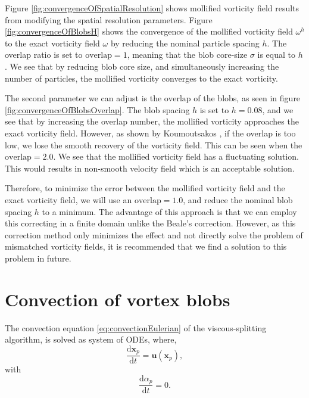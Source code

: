 Figure \ref{fig:convergenceOfSpatialResolution} shows mollified vorticity field results from modifying the spatial resolution parameters. Figure \ref{fig:convergenceOfBlobsH} shows the convergence of the mollified vorticity field $\omega^h$ to the exact vorticity field $\omega$ by reducing the nominal particle spacing $h$. The overlap ratio is set to $\mathrm{overlap} = 1$, meaning that the blob core-size $\sigma$ is equal to $h$. We see that by reducing blob core size, and simultaneously increasing the number of particles, the mollified vorticity converges to the exact vorticity. 

The second parameter we can adjust is the $\mathrm{overlap}$ of the blobs, as seen in figure \ref{fig:convergenceOfBlobsOverlap}. The blob spacing $h$ is set to $h = 0.08$, and we see that by increasing the overlap number, the mollified vorticity approaches the exact vorticity field. However, as shown by Koumoutsakos \cite{Cottet2000a}, if the overlap is too low, we lose the smooth recovery of the vorticity field. This can be seen when the $\mathrm{overlap} = 2.0$. We see that the mollified vorticity field has a fluctuating solution. This would results in non-smooth velocity field which is an acceptable solution.

Therefore, to minimize the error between the mollified vorticity field and the exact vorticity field, we will use an $\mathrm{overlap} = 1.0$, and reduce the nominal blob spacing $h$ to a minimum. The advantage of this approach is that we can employ this correcting in a finite domain unlike the Beale's correction. However, as this correction method only minimizes the effect and not directly solve the problem of mismatched vorticity fields, it is recommended that we find a solution to this problem in future.

\section{Convection of vortex blobs}

The convection equation \ref{eq:convectionEulerian} of the viscous-splitting algorithm, is solved as system of ODEs, where,
	\begin{equation}
	\frac{\mathrm{d}\mathbf{x}_p}{\mathrm{d}t} = \mathbf{u}\left(\mathbf{x}_p\right),
	\label{eq:convectionODE}
	\end{equation}
with
	\begin{equation}
	\frac{\mathrm{d}\alpha_p}{\mathrm{d}t} = 0.
	\label{eq:conservationODE}
	\end{equation}

